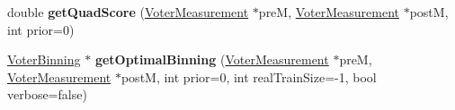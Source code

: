 \begin{DoxyCompactItemize}
\item 
\hypertarget{classVoterDataSet_a5c641ff7d0ce7a150ef8ebd46bc4da5e}{double {\bfseries get\-Quad\-Score} (\hyperlink{classVoterMeasurement}{Voter\-Measurement} $\ast$pre\-M, \hyperlink{classVoterMeasurement}{Voter\-Measurement} $\ast$post\-M, int prior=0)}\label{classVoterDataSet_a5c641ff7d0ce7a150ef8ebd46bc4da5e}

\item 
\hypertarget{classVoterDataSet_aaab30a1a42a992b61a66107353bb89c6}{\hyperlink{classVoterBinning}{Voter\-Binning} $\ast$ {\bfseries get\-Optimal\-Binning} (\hyperlink{classVoterMeasurement}{Voter\-Measurement} $\ast$pre\-M, \hyperlink{classVoterMeasurement}{Voter\-Measurement} $\ast$post\-M, int prior=0, int real\-Train\-Size=-\/1, bool verbose=false)}\label{classVoterDataSet_aaab30a1a42a992b61a66107353bb89c6}

\end{DoxyCompactItemize}
